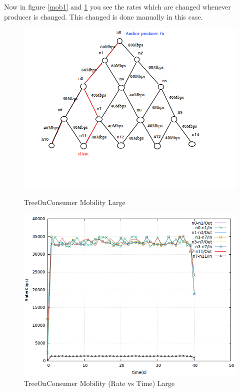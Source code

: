 Now in figure \ref{mob1} and \ref{mob2} you see the rates which are changed whenever producer is changed. This changed is done manually in this case.



\begin{figure}[H]

\begin{center}

\includegraphics[scale = 0.5]{Figures/Mob2.png}

\caption{TreeOnConsumer Mobility Large} \label{Mob2} 


\includegraphics[scale = 0.4]{Figures/mob2.png}

\caption{TreeOnConsumer Mobility (Rate vs Time) Large} \label{mob2} 


\end{center}

\end{figure}


